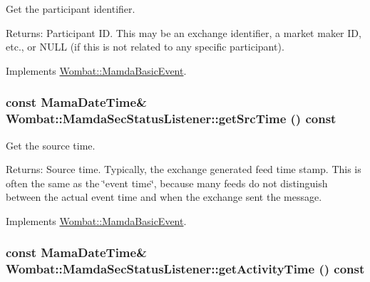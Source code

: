 Get the participant identifier. 

\begin{Desc}
\item[Returns:]Participant ID. This may be an exchange identifier, a market maker ID, etc., or NULL (if this is not related to any specific participant). \end{Desc}


Implements \hyperlink{classWombat_1_1MamdaBasicEvent_94e531c6ae9ae7798725db14facbd6e2}{Wombat::Mamda\-Basic\-Event}.\hypertarget{classWombat_1_1MamdaSecStatusListener_75adf29cbb39a3060b593f6bb43a7d42}{
\subsubsection[getSrcTime]{\setlength{\rightskip}{0pt plus 5cm}const Mama\-Date\-Time\& Wombat::Mamda\-Sec\-Status\-Listener::get\-Src\-Time () const}}
\label{classWombat_1_1MamdaSecStatusListener_75adf29cbb39a3060b593f6bb43a7d42}


Get the source time. 

\begin{Desc}
\item[Returns:]Source time. Typically, the exchange generated feed time stamp. This is often the same as the \char`\"{}event time\char`\"{}, because many feeds do not distinguish between the actual event time and when the exchange sent the message. \end{Desc}


Implements \hyperlink{classWombat_1_1MamdaBasicEvent_60b5d51f3799c4762090505ef5b213e9}{Wombat::Mamda\-Basic\-Event}.\hypertarget{classWombat_1_1MamdaSecStatusListener_e68b03d56c3402e337a06b63ef5566d1}{
\subsubsection[getActivityTime]{\setlength{\rightskip}{0pt plus 5cm}const Mama\-Date\-Time\& Wombat::Mamda\-Sec\-Status\-Listener::get\-Activity\-Time () const}}
\label{classWombat_1_1MamdaSecStatusListener_e68b03d56c3402e337a06b63ef5566d1}



